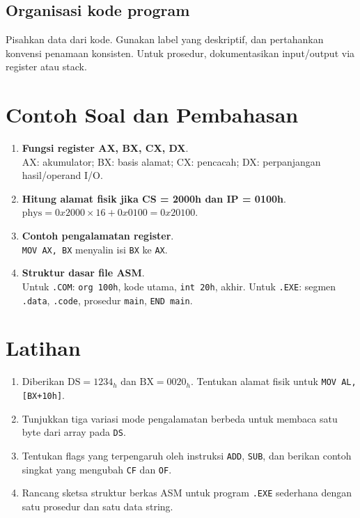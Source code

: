 \subsection{Organisasi kode program}
Pisahkan data dari kode. Gunakan label yang deskriptif, dan pertahankan konvensi penamaan konsisten. Untuk prosedur, dokumentasikan input/output via register atau stack.

\section{Contoh Soal dan Pembahasan}
\begin{enumerate}
  \item \textbf{Fungsi register AX, BX, CX, DX}.\\ AX: akumulator; BX: basis alamat; CX: pencacah; DX: perpanjangan hasil/operand I/O.
  \item \textbf{Hitung alamat fisik jika CS = 2000h dan IP = 0100h}.\\ \(\text{phys} = 0x2000\times 16 + 0x0100 = 0x20100\).
  \item \textbf{Contoh pengalamatan register}.\\ \texttt{MOV AX, BX} menyalin isi \texttt{BX} ke \texttt{AX}.
  \item \textbf{Struktur dasar file ASM}.\\ Untuk \texttt{.COM}: \texttt{org 100h}, kode utama, \texttt{int 20h}, akhir. Untuk \texttt{.EXE}: segmen \texttt{.data}, \texttt{.code}, prosedur \texttt{main}, \texttt{END main}.
\end{enumerate}

\section{Latihan}
\begin{enumerate}
  \item Diberikan \(\text{DS}=1234_h\) dan \(\text{BX}=0020_h\). Tentukan alamat fisik untuk \texttt{MOV AL, [BX+10h]}.
  \item Tunjukkan tiga variasi mode pengalamatan berbeda untuk membaca satu byte dari array pada \texttt{DS}.
  \item Tentukan flags yang terpengaruh oleh instruksi \texttt{ADD}, \texttt{SUB}, dan berikan contoh singkat yang mengubah \texttt{CF} dan \texttt{OF}.
  \item Rancang sketsa struktur berkas ASM untuk program \texttt{.EXE} sederhana dengan satu prosedur dan satu data string.
\end{enumerate}

